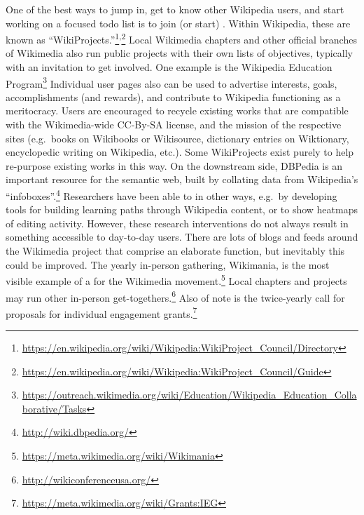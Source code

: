 One of the best ways to jump in, get to know other Wikipedia users,
and start working on a focused todo list is to join (or start)
.  Within Wikipedia, these are known
as
``WikiProjects.''\footnote{\url{https://en.wikipedia.org/wiki/Wikipedia:WikiProject_Council/Directory}}\textsuperscript{,}\footnote{\url{https://en.wikipedia.org/wiki/Wikipedia:WikiProject_Council/Guide}}
Local Wikimedia chapters and other official branches of Wikimedia also
run public projects with their own lists of objectives, typically with
an invitation to get involved.  One example is the Wikipedia Education
Program\footnote{\url{https://outreach.wikimedia.org/wiki/Education/Wikipedia_Education_Collaborative/Tasks}}
Individual user pages also can be used to advertise interests, goals,
accomplishments (and rewards), and contribute to Wikipedia functioning as
a meritocracy.
%
Users are encouraged to recycle existing works that are compatible
with the Wikimedia-wide CC-By-SA license, and the mission of the
respective sites (e.g.~books on Wikibooks or Wikisource, dictionary
entries on Wiktionary, encyclopedic writing on Wikipedia, etc.).  Some
WikiProjects exist purely to help re-purpose existing works in this
way.  On the downstream side, DBPedia is an important resource for the
semantic web, built by collating data from Wikipedia's
``infoboxes''.\footnote{\url{http://wiki.dbpedia.org/}} Researchers
have been able to  in other ways,
e.g.~by developing tools for building learning paths through Wikipedia
content, or to show heatmaps of editing activity.  However, these
research interventions do not always result in something accessible to
day-to-day users. There are lots of blogs and feeds around the
Wikimedia project that comprise an elaborate 
function, but inevitably this could be improved.
% 
The yearly in-person gathering, Wikimania, is the most visible
example of a  for the Wikimedia movement.\footnote{\url{https://meta.wikimedia.org/wiki/Wikimania}}
Local chapters and projects may run other in-person get-togethers.\footnote{\url{http://wikiconferenceusa.org/}}
Also
of note is the twice-yearly call for proposals for individual
engagement
grants.\footnote{\url{https://meta.wikimedia.org/wiki/Grants:IEG}}

